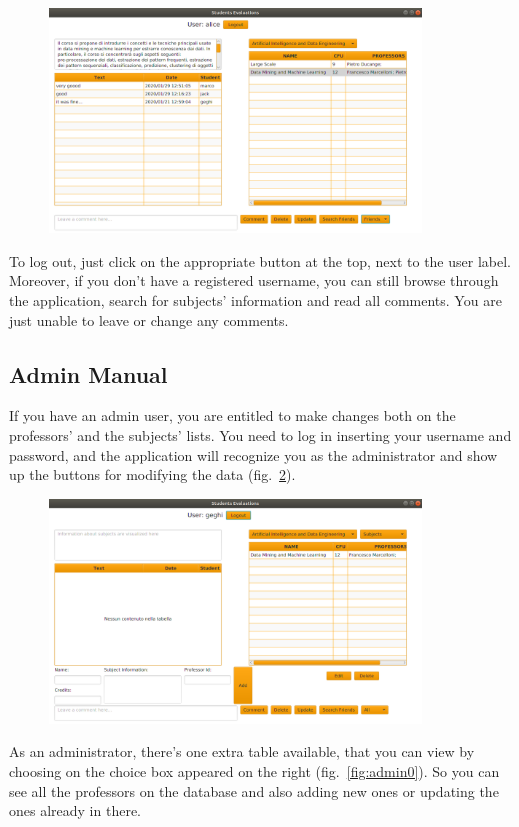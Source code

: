 \documentclass[a4paper]{article}
\begin{document}
\begin{figure}[h]
\centering
\includegraphics[width=0.88\textwidth]{images/screens/screen7}
\label{fig:screen7}
\end{figure}

To log out, just click on the appropriate button at the top, next to the user label.\\
Moreover, if you don't have a registered username, you can still browse through the application, search for subjects' information and read all comments. You are just unable to leave or change any comments.

\clearpage
\subsection{Admin Manual}
If you have an admin user, you are entitled to make changes both on the professors' and the subjects' lists. You need to log in inserting your username and password, and the application will recognize you as the administrator and show up the buttons for modifying the data (fig.~\ref{fig:adminLogin}).

\begin{figure}[h]
\centering
\includegraphics[width=0.88\textwidth]{images/screens/adminLogin}
\label{fig:adminLogin}
\end{figure}
As an administrator, there's one extra table available, that you can view by choosing on the choice box appeared on the right (fig.~\ref{fig:admin0}). So you can see all the professors on the database and also adding new ones or updating the ones already in there.
\end{document}
